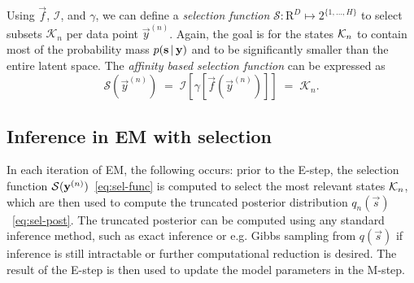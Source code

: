 Using $\vec{f}$, $\mathcal{I}$, and $\gamma$, we can define a 
\emph{selection function} $\mathcal{S}: \mathrm{R}^D \mapsto 2^{ \{1,\dots,H \}}$ 
to select subsets $\mathcal{K}_n$ per data point $\vec{y}^{(n)}$.   
Again, the goal is for the states $\mathcal{K}_{n}$ to contain most of the probability mass
$p({\mathbf{s}} \, | \, {\mathbf{y}})$ and to be significantly smaller than the entire
latent space.  
%
The \textit{affinity based selection function}  can be expressed as
%
\vspace{-.1cm}
\begin{equation}\label{eq:sel-func}
\mathcal{S}(\vec{y}^{(n)}) \;=\; \mathcal{I} \left[  \gamma \left[ \vec{f}(\vec{y}^{(n)}) \right]  \right] \;=\; \mathcal{K}_n.
\end{equation}
%


\subsection{Inference in EM with selection}
%
In each iteration of EM, the following occurs: 
prior to the E-step, the selection function $\mathcal{S}({\mathbf{y}}^{(n)})$~\eqref{eq:sel-func} is computed to select the most relevant states $\mathcal{K}_{n}$, 
which are then used to compute the truncated posterior distribution $q_n(\vec{s})$~\eqref{eq:sel-post}.
The truncated posterior can be computed using any standard inference method, 
such as exact inference or e.g. Gibbs sampling from $q(\vec{s})$  %
if inference is still intractable or further computational reduction is desired.
The result of the E-step is then used to update the model parameters in the M-step. 



